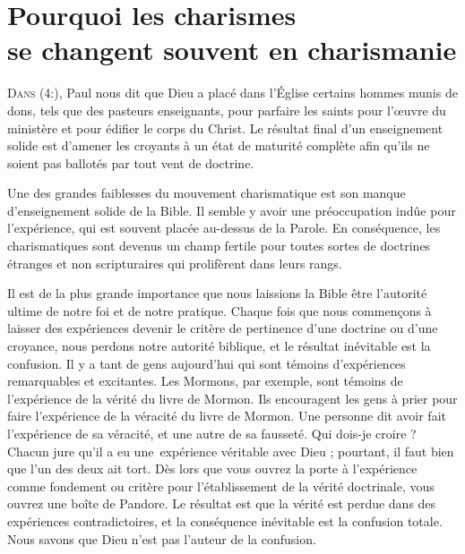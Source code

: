 \chapter[Pourquoi les charismes se changent souvent en charismanie]{Pourquoi les charismes\\ se changent souvent en charismanie}
\renewcommand{\chaphead}{\textls[0]{Pourquoi les charismes se changent souvent en charismanie}}

\lettrine{D}{ans (4:),}
 Paul nous dit que Dieu a placé dans l'Église
 certains hommes munis de dons, tels que des pasteurs enseignants,
 pour parfaire les saints pour l'œuvre du ministère et pour édifier le corps
 du Christ. Le résultat final d'un enseignement solide est d'amener
 les croyants à un état de maturité complète afin qu'ils ne soient
 pas ballotés par tout vent de doctrine.

Une des grandes faiblesses du mouvement charismatique est son manque
 d'enseignement solide de la Bible. Il semble y avoir une préoccupation
 indûe pour l'expérience, qui est souvent placée au-dessus de la Parole.
 En conséquence, les charismatiques sont devenus un champ fertile
 pour toutes sortes de doctrines étranges et non scripturaires qui prolifèrent
 dans leurs rangs.

Il est de la plus grande importance que nous laissions la Bible être
 l'autorité ultime de notre foi et de notre pratique.
 Chaque fois que nous commençons à laisser des expériences
 devenir le critère de pertinence d'une doctrine ou d'une croyance,
 nous perdons notre autorité biblique, et le résultat inévitable
 est la confusion. Il y a tant de gens aujourd'hui qui sont témoins
 d'expériences remarquables et excitantes. Les Mormons, par exemple,
 \Og sont témoins \Fg{} de l'expé\-rience de la vérité du livre de Mormon.
 Ils encouragent les gens à prier pour faire l'expérience de la véracité
 du livre de Mormon. Une personne dit avoir fait l'expérience
 de sa véracité, et une autre de sa fausseté. Qui dois-je croire ?
 Chacun jure qu'il a eu une~expérience véritable avec Dieu ;
 pourtant, il faut bien que l'un des deux ait tort.
 Dès lors que vous ouvrez la porte à l'expérience comme fondement
 ou critère pour l'établissement de la vérité doctrinale, vous ouvrez une boîte de Pandore.
 Le résultat est que la vérité est perdue dans des expériences
 contradictoires, et la conséquence inévitable est la confusion totale.
 Nous savons que Dieu n'est pas l'auteur de la confusion.


